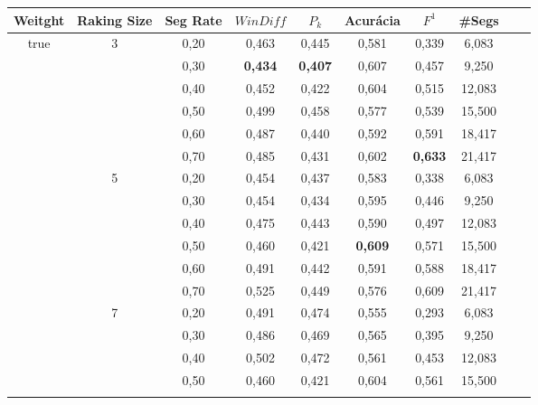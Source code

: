 \documentclass{article}
\begin{document}
\begin{longtable}[c]{|c|c|c|c|c|c|c|c|c|c|} 
\hline 
Weitght & Raking Size & Seg Rate & $WinDiff$ & $P_k$  & Acurácia & $F^1$ & \#Segs\\ \hline 
 \multirow{18}{*}{true} 
 & \multirow{6}{*}{3} 
                 & 0,20    &     0,463 &  0,445 & 0,581 & 0,339 & 6,083                \\ \cline{3-8}
    &            & 0,30    &     \cellcolor{gray!20} \textbf{0,434} & \cellcolor{gray!20} \textbf{0,407} & 0,607 & 0,457 & 9,250  \\\cline{3-8}
    &            & 0,40    &     0,452 &  0,422 & 0,604 & 0,515 & 12,083              \\ \cline{3-8}
    &            & 0,50    &     0,499 &  0,458 & 0,577 & 0,539 & 15,500              \\ \cline{3-8}
    &            & 0,60    &     0,487 &  0,440 & 0,592 & 0,591 & 18,417              \\ \cline{3-8}
    &            & 0,70    &     0,485 &  0,431 & 0,602 & \cellcolor{gray!20} \textbf{0,633} & 21,417 \\ \cline{2-8}
	   & \multirow{6}{*}{5} 
                 & 0,20    &     0,454 &  0,437 & 0,583 & 0,338 & 6,083               \\ \cline{3-8}
    &            & 0,30    &     0,454 &  0,434 & 0,595 & 0,446 & 9,250               \\ \cline{3-8}
    &            & 0,40    &     0,475 &  0,443 & 0,590 & 0,497 & 12,083              \\ \cline{3-8}
    &            & 0,50    &     0,460 &  0,421 & \cellcolor{gray!20} \textbf{0,609} & 0,571 & 15,500  \\ \cline{3-8}
    &            & 0,60    &     0,491 &  0,442 & 0,591 & 0,588 & 18,417              \\ \cline{3-8}
    &            & 0,70    &     0,525 &  0,449 & 0,576 & 0,609 & 21,417              \\ \cline{2-8}
	   & \multirow{6}{*}{7} 
                 & 0,20    &     0,491 &  0,474 & 0,555 & 0,293 & 6,083               \\ \cline{3-8}
    &            & 0,30    &     0,486 &  0,469 & 0,565 & 0,395 & 9,250               \\ \cline{3-8}
    &            & 0,40    &     0,502 &  0,472 & 0,561 & 0,453 & 12,083              \\ \cline{3-8}
    &            & 0,50    &     0,460 &  0,421 & 0,604 & 0,561 & 15,500              \\ \cline{3-8}

\end{longtable}
\end{document}
